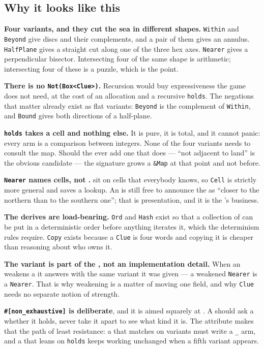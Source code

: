 \documentclass{article}
\begin{document}
\subsection{Why it looks like this}

\textbf{Four variants, and they cut the sea in different shapes.} \texttt{Within} and
\texttt{Beyond} give discs and their complements, and a pair of them gives an annulus.
\texttt{HalfPlane} gives a straight cut along one of the three hex axes. \texttt{Nearer} gives a
perpendicular bisector. Intersecting four \clues{} of the same shape is arithmetic; intersecting
four of these is a puzzle, which is the point.

\textbf{There is no \texttt{Not(Box<Clue>)}.} Recursion would buy expressiveness the game does not
need, at the cost of an allocation and a recursive \texttt{holds}. The negations that matter already
exist as flat variants: \texttt{Beyond} is the complement of \texttt{Within}, and \texttt{Bound}
gives both directions of a half-plane.

\textbf{\texttt{holds} takes a cell and nothing else.} It is pure, it is total, and it cannot
panic: every arm is a comparison between integers. None of the four variants needs to consult the
map. Should the \WG{} ever add one that does --- ``not adjacent to land'' is the obvious candidate
--- the signature grows a \texttt{\&Map} at that point and not before.

\textbf{\texttt{Nearer} names cells, not \islands.} \islands sit on cells that everybody knows, so
\texttt{Cell} is strictly more general and saves a lookup. An \island{} is still free to announce
the \clue{} as ``closer to the northern \island{} than to the southern one''; that is presentation,
and it is the
\island's business.

\textbf{The derives are load-bearing.} \texttt{Ord} and \texttt{Hash} exist so that a collection of
\clues{} can be put in a deterministic order before anything iterates it, which the determinism
rules require. \texttt{Copy} exists because a \texttt{Clue} is four words and copying it is cheaper
than reasoning about who owns it.

\textbf{The variant is part of the \clue, not an implementation detail.} When an \island{} weakens
a \clue{} it answers with the same variant it was given --- a weakened \texttt{Nearer} is a
\texttt{Nearer}. That is why weakening is a matter of moving one field, and
why \texttt{Clue} needs no separate notion of strength.

\textbf{\texttt{\#[non\_exhaustive]} is deliberate}, and it is aimed squarely at \ships. A \ship{}
should ask a \clue{} whether it holds, never take it apart to see what kind it is. The attribute
makes that the path of least resistance: a \ship{} that matches on variants must write a \texttt{\_}
arm, and a \ship{} that leans on \texttt{holds} keeps working unchanged when a fifth variant
appears.
\end{document}
